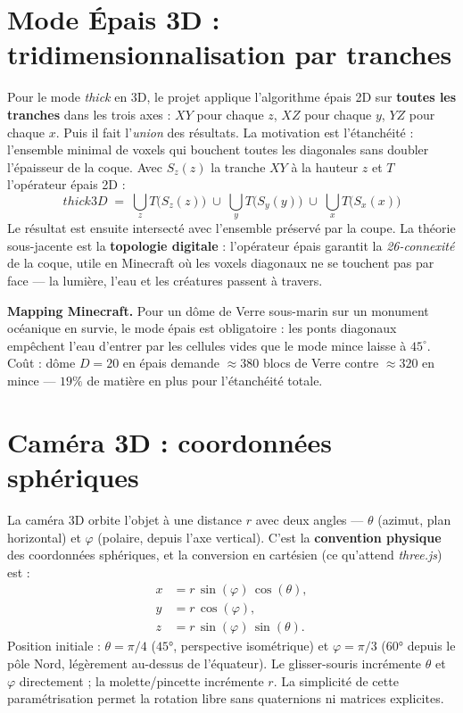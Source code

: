 \documentclass[12pt,a4paper]{scrartcl}
\newcommand{\acc}[1]{\textcolor{accent}{\textbf{#1}}}
\begin{document}
\section{Mode Épais 3D : tridimensionnalisation par tranches}

Pour le mode \emph{thick} en 3D, le projet applique l'algorithme épais 2D sur \acc{toutes les tranches} dans les trois axes : $XY$ pour chaque $z$, $XZ$ pour chaque $y$, $YZ$ pour chaque $x$. Puis il fait l'\emph{union} des résultats. La motivation est l'étanchéité : l'ensemble minimal de voxels qui bouchent toutes les diagonales sans doubler l'épaisseur de la coque. Avec $S_z(z)$ la tranche $XY$ à la hauteur $z$ et $T$ l'opérateur épais 2D :
\[
\mathit{thick3D} \;=\;
\bigcup_{z} T\bigl(S_z(z)\bigr) \;\cup\;
\bigcup_{y} T\bigl(S_y(y)\bigr) \;\cup\;
\bigcup_{x} T\bigl(S_x(x)\bigr)
\]
Le résultat est ensuite intersecté avec l'ensemble préservé par la coupe. La théorie sous-jacente est la \acc{topologie digitale} : l'opérateur épais garantit la \emph{26-connexité} de la coque, utile en Minecraft où les voxels diagonaux ne se touchent pas par face --- la lumière, l'eau et les créatures passent à travers.

\begin{minec}
\textbf{Mapping Minecraft.} Pour un dôme de Verre sous-marin sur un monument océanique en survie, le mode épais est obligatoire : les ponts diagonaux empêchent l'eau d'entrer par les cellules vides que le mode mince laisse à $45^\circ$. Coût : dôme $D=20$ en épais demande $\approx 380$ blocs de Verre contre $\approx 320$ en mince --- $19\%$ de matière en plus pour l'étanchéité totale.
\end{minec}

\section{Caméra 3D : coordonnées sphériques}

La caméra 3D orbite l'objet à une distance $r$ avec deux angles --- $\theta$ (azimut, plan horizontal) et $\varphi$ (polaire, depuis l'axe vertical). C'est la \acc{convention physique} des coordonnées sphériques, et la conversion en cartésien (ce qu'attend \emph{three.js}) est :
\[
\begin{aligned}
x &= r\,\sin(\varphi)\,\cos(\theta), \\
y &= r\,\cos(\varphi), \\
z &= r\,\sin(\varphi)\,\sin(\theta).
\end{aligned}
\]
Position initiale : $\theta = \pi/4$ ($45°$, perspective isométrique) et $\varphi = \pi/3$ ($60°$ depuis le pôle Nord, légèrement au-dessus de l'équateur). Le glisser-souris incrémente $\theta$ et $\varphi$ directement ; la molette/pincette incrémente $r$. La simplicité de cette paramétrisation permet la rotation libre sans quaternions ni matrices explicites.
\end{document}
